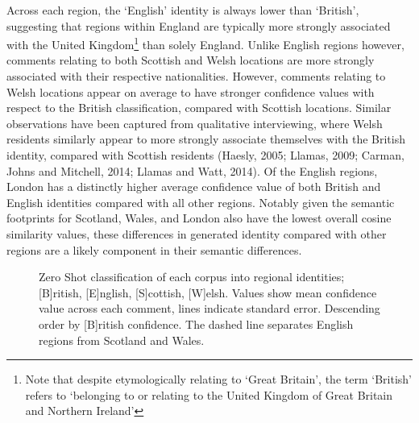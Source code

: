 \documentclass[
]{article}
\begin{document}
Across each region, the `English' identity is always lower than
`British', suggesting that regions within England are typically more
strongly associated with the United Kingdom\footnote{Note that despite
  etymologically relating to `Great Britain', the term `British' refers
  to `belonging to or relating to the United Kingdom of Great Britain
  and Northern Ireland'} than solely England. Unlike English regions
however, comments relating to both Scottish and Welsh locations are more
strongly associated with their respective nationalities. However,
comments relating to Welsh locations appear on average to have stronger
confidence values with respect to the British classification, compared
with Scottish locations. Similar observations have been captured from
qualitative interviewing, where Welsh residents similarly appear to more
strongly associate themselves with the British identity, compared with
Scottish residents (Haesly, 2005; Llamas, 2009; Carman, Johns and
Mitchell, 2014; Llamas and Watt, 2014). Of the English regions, London
has a distinctly higher average confidence value of both British and
English identities compared with all other regions. Notably given the
semantic footprints for Scotland, Wales, and London also have the lowest
overall cosine similarity values, these differences in generated
identity compared with other regions are a likely component in their
semantic differences.

\begin{figure}


\caption{\label{fig-identity}Zero Shot classification of each corpus
into regional identities; {[}B{]}ritish, {[}E{]}nglish, {[}S{]}cottish,
{[}W{]}elsh. Values show mean confidence value across each comment,
lines indicate standard error. Descending order by {[}B{]}ritish
confidence. The dashed line separates English regions from Scotland and
Wales.}

\end{figure}%
\end{document}

